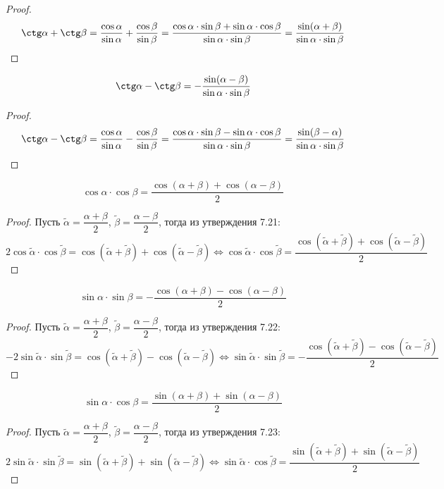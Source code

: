 \documentclass[12pt]{article}
\begin{document}
    \begin{proof}
        $$\ctg\alpha+\ctg\beta=\dfrac{\cos\alpha}{\sin\alpha}+\dfrac{\cos\beta}{\sin\beta}=\dfrac{\cos\alpha\cdot\sin\beta+\sin\alpha\cdot\cos\beta}{\sin\alpha\cdot\sin\beta}=\dfrac{\sin(\alpha+\beta)}{\sin\alpha\cdot\sin\beta}$$
    \end{proof}
    \begin{statement}
        $$\ctg\alpha-\ctg\beta=-\dfrac{\sin(\alpha-\beta)}{\sin\alpha\cdot\sin\beta}$$
    \end{statement}
    \begin{proof}
        $$\ctg\alpha-\ctg\beta=\dfrac{\cos\alpha}{\sin\alpha}-\dfrac{\cos\beta}{\sin\beta}=\dfrac{\cos\alpha\cdot\sin\beta-\sin\alpha\cdot\cos\beta}{\sin\alpha\cdot\sin\beta}=\dfrac{\sin(\beta-\alpha)}{\sin\alpha\cdot\sin\beta}$$
    \end{proof}
    \begin{statement}
        $$\cos\alpha\cdot\cos\beta=\dfrac{\cos(\alpha+\beta)+\cos(\alpha-\beta)}{2}$$
    \end{statement}
    \begin{proof}
        Пусть $\tilde{\alpha} = \dfrac{\alpha+\beta}{2}$, $\tilde{\beta} = \dfrac{\alpha-\beta}{2}$, тогда из утверждения 7.21:
        $$2\cos\tilde{\alpha}\cdot\cos\tilde{\beta}=\cos(\tilde{\alpha}+\tilde{\beta})+\cos(\tilde{\alpha}-\tilde{\beta})\Longleftrightarrow \cos\tilde{\alpha}\cdot\cos\tilde{\beta}=\dfrac{\cos(\tilde{\alpha}+\tilde{\beta})+\cos(\tilde{\alpha}-\tilde{\beta})}{2}$$
    \end{proof}
    \begin{statement}
        $$\sin\alpha\cdot\sin\beta=-\dfrac{\cos(\alpha+\beta)-\cos(\alpha-\beta)}{2}$$
    \end{statement}
    \begin{proof}
        Пусть $\tilde{\alpha} = \dfrac{\alpha+\beta}{2}$, $\tilde{\beta} = \dfrac{\alpha-\beta}{2}$, тогда из утверждения 7.22:
        $$-2\sin\tilde{\alpha}\cdot\sin\tilde{\beta}=\cos(\tilde{\alpha}+\tilde{\beta})-\cos(\tilde{\alpha}-\tilde{\beta})\Longleftrightarrow \sin\tilde{\alpha}\cdot\sin\tilde{\beta}=-\dfrac{\cos(\tilde{\alpha}+\tilde{\beta})-\cos(\tilde{\alpha}-\tilde{\beta})}{2}$$
    \end{proof}
    \begin{statement}
        $$\sin\alpha\cdot\cos\beta=\dfrac{\sin(\alpha+\beta)+\sin(\alpha-\beta)}{2}$$
    \end{statement}
    \begin{proof}
        Пусть $\tilde{\alpha} = \dfrac{\alpha+\beta}{2}$, $\tilde{\beta} = \dfrac{\alpha-\beta}{2}$, тогда из утверждения 7.23:
        $$2\sin\tilde{\alpha}\cdot\sin\tilde{\beta}=\sin(\tilde{\alpha}+\tilde{\beta})+\sin(\tilde{\alpha}-\tilde{\beta})\Longleftrightarrow \sin\tilde{\alpha}\cdot\cos\tilde{\beta}=\dfrac{\sin(\tilde{\alpha}+\tilde{\beta})+\sin(\tilde{\alpha}-\tilde{\beta})}{2}$$
    \end{proof}
\end{document}
